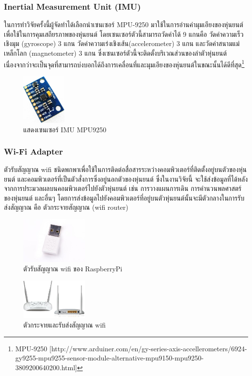 \subsubsection*{Inertial Measurement Unit (IMU)}
ในการทำวิจัยครั้งนี้ผู้จัดทำได้เลือกนำเซนเซอร์ MPU-9250 มาใช้ในการอ่านค่ามุมเอียงของหุ่นยนต์เพื่อใช้ในการคุมเสถียรภาพของหุ่นยนต์
โดยเซนเซอร์ตัวนี้สามารถวัดค่าได้ 9 แกนคือ วัดค่าความเร็วเชิงมุม (gyroscope) 3 แกน วัดค่าความเร่งเชิงเส้น(accelerometer) 3 แกน
และวัดค่าสนามแม่เหล็กโลก (magnetometer) 3 แกน ซึ่งเซนเซอร์ตัวนี้จะติดตั้งบริเวณส่วนของลำตัวหุ่นยนต์
เนื่องจากว่าจะเป็นจุดที่สามารถบ่งบอกได้ถึงการเคลื่อนที่และมุมเอียงของหุ่นยนต์ในขณะนั้นได้ดีที่สุด\footnote{ MPU-9250 [http://www.arduiner.com/en/gy-series-axis-accellerometers/6924-gy9255-mpu9255-sensor-module-alternative-mpu9150-mpu9250-3809200640200.html] }
\begin{figure}[!ht]
    \centering
    \includegraphics[width=0.2\textwidth]{chapter3/images/mpu9250.jpeg}
    \caption{แสดงเซนเซอร์ IMU MPU9250}
    \label{fig:mpu9250}
\end{figure}

\subsubsection*{Wi-Fi Adapter}
ตัวรับสัญญาณ wifi ชนิดพกพาเพื่อใช้ในการติดต่อสื่อสารระหว่างคอมพิวเตอร์ที่ติดตั้งอยู่บนตัวของหุ่นยนต์
และคอมพิวเตอร์ที่เป็นตัวสั่งการซึ่งอยู่นอกตัวของหุ่นยนต์ ซึ่งในงานวิจัยนี้
จะใช้ส่งข้อมูลที่ได้หลังจากการประมวลผลบนคอมพิวเตอร์ไปยังตัวหุ่นยนต์ เช่น การวางแผนการเดิน การคำนวนพลศาสตร์ของหุ่นยนต์
และอื่นๆ โดยการส่งข้อมูลไปยังคอมพิวเตอร์ที่อยู่บนตัวหุ่นยนต์นั้นจะมีตัวกลางในการรับส่งสัญญาณ
คือ ตัวกระจายสัญญาณ (wifi router)
\begin{figure}[!ht]
    \centering
    \includegraphics[width=0.3\textwidth]{chapter3/images/rpi_wifi_adaptor.jpg}
    \caption{ตัวรับสัญญาณ wifi ของ RaspberryPi}
    \label{fig:rpi_wifi_adaptor}
\end{figure}
\begin{figure}[!ht]
    \centering
    \includegraphics[width=0.3\textwidth]{chapter3/images/wifi_router.jpg}
    \caption{ตัวกระจายและรับส่งสัญญาณ wifi}
    \label{fig:wifi_router}
\end{figure}


